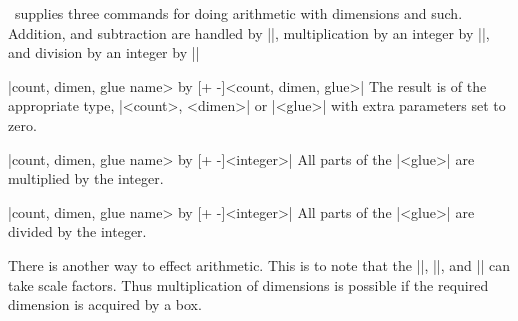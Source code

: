 \tex\ supplies three commands for doing arithmetic with dimensions and such. 
Addition, and subtraction are handled by |\advance|, multiplication by an
integer by |\multiply|, and division by an integer by |\divide|

\beginblockmode
\mbr
\@|\advance \<count, dimen, glue name> by [+ -]<count, dimen, glue>|
\nbr
The result is of the appropriate type, |<count>, <dimen>| or |<glue>| with
extra parameters set to zero.

\mbr
\@|\multiply \<count, dimen, glue name> by [+ -]<integer>|
\nbr
All parts of the |<glue>| are multiplied by the integer.

\@|\divide \<count, dimen, glue name> by [+ -]<integer>|
\nbr
All parts of the |<glue>| are divided by the integer.

There is another way to effect arithmetic. This is to note that the
|\wd|, |\ht|, and |\dp| can take scale factors. Thus multiplication of
dimensions is possible if the required dimension is acquired by a box.
\endblockmode
\ejectpage
\done